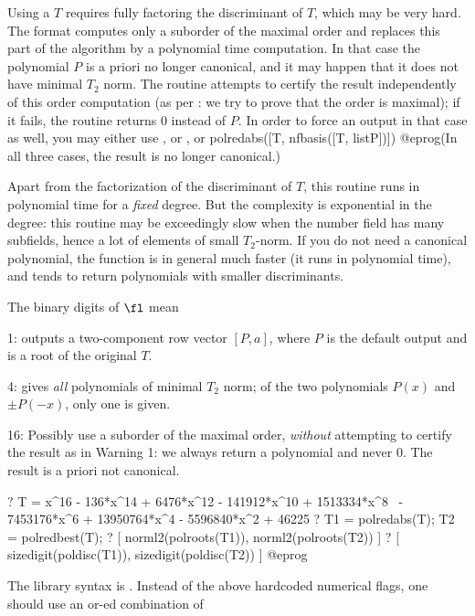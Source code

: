  Using a  $T$ requires fully factoring the
discriminant of $T$, which may be very hard. The format \kbd{[T, listP]}
computes only a suborder of the maximal order and replaces this part of the
algorithm by a polynomial time computation. In that case the polynomial $P$
is a priori no longer canonical, and it may happen that it does not have
minimal $T_2$ norm. The routine attempts to certify the result independently
of this order computation (as per : we try to prove that the
order is maximal); if it fails, the routine returns $0$ instead of $P$.
In order to force an output in that case as well, you may either use
, or , or
\bprog
  polredabs([T, nfbasis([T, listP])])
@eprog\noindent (In all three cases, the result is no longer canonical.)

 Apart from the factorization of the discriminant of
$T$, this routine runs in polynomial time for a \emph{fixed} degree.
But the complexity is exponential in the degree: this routine
may be exceedingly slow when the number field has many subfields, hence a
lot of elements of small $T_2$-norm. If you do not need a canonical
polynomial, the function  is in general much faster (it runs
in polynomial time), and tends to return polynomials with smaller
discriminants.

The binary digits of $\fl$ mean

1: outputs a two-component row vector $[P,a]$, where $P$ is the default
output and  is a root of the original $T$.

4: gives \emph{all} polynomials of minimal $T_2$ norm; of the two polynomials
$P(x)$ and $\pm P(-x)$, only one is given.

16: Possibly use a suborder of the maximal order, \emph{without} attempting to
certify the result as in Warning 1: we always return a polynomial and never
$0$. The result is a priori not canonical.

\bprog
? T = x^16 - 136*x^14 + 6476*x^12 - 141912*x^10 + 1513334*x^8 \
      - 7453176*x^6 + 13950764*x^4 - 5596840*x^2 + 46225
? T1 = polredabs(T); T2 = polredbest(T);
? [ norml2(polroots(T1)), norml2(polroots(T2)) ]
? [ sizedigit(poldisc(T1)), sizedigit(poldisc(T2)) ]
@eprog

The library syntax is .
Instead of the above hardcoded numerical flags, one should use an
or-ed combination of


